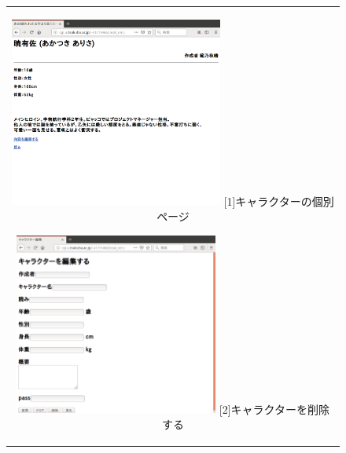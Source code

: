 \documentclass[12pt,a4paper]{jarticle}
\begin{document}
\begin{ttfamily}
\begin{figure}[htbp]
  \begin{center}
    \begin{tabular}{c}

      \begin{minipage}{0.55\hsize}
        \begin{center}
          \includegraphics[width=7.0cm]{10-3-30.eps}
          \hspace{1.6cm} [1]キャラクターの個別ページ
        \end{center}
      \end{minipage}

      \begin{minipage}{0.55\hsize}
        \begin{center}
          \includegraphics[width=6.7cm]{10-3-31.eps}
          \hspace{1.6cm} [2]キャラクターを削除する
        \end{center}
      \end{minipage}

      \begin{minipage}{0.55\hsize}
        \vspace{30mm}
      \end{minipage} \\
 

\end{tabular}
\end{center}
\end{figure}
\end{ttfamily}
\end{document}
